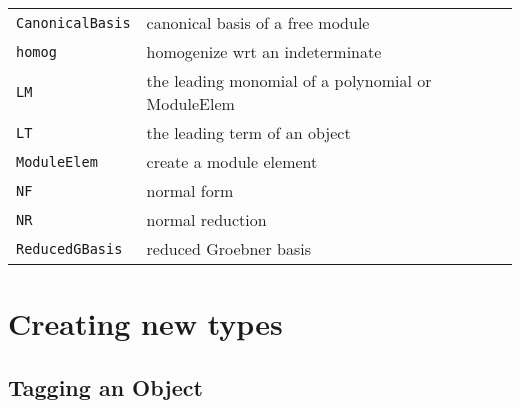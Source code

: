 \documentclass[a4paper]{mybook}
\begin{document}
\begin{center}
\begin{longtable}{ll}
   
{\verb~CanonicalBasis~} &
      canonical basis of a free module\\
   
{\verb~homog~} &
      homogenize wrt an indeterminate\\
   
{\verb~LM~} &
      the leading monomial of a polynomial or ModuleElem\\
   
{\verb~LT~} &
      the leading term of an object\\
   
{\verb~ModuleElem~} &
      create a module element\\
   
{\verb~NF~} &
      normal form\\
   
{\verb~NR~} &
      normal reduction\\
   
{\verb~ReducedGBasis~} &
      reduced Groebner basis\\
   
\end{longtable}
\end{center}

\noindent



\chapter{Creating new types}
\label{Creating new types}

      

\section{Tagging an Object}
\label{Tagging an Object}
\end{document}
